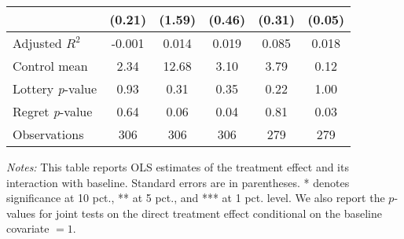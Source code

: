 \begin{table}[htbp]
{\begin{threeparttable}
\begin{tabular}{l*{5}{c}}
                &   (0.21)         &   (1.59)         &   (0.46)         &   (0.31)         &   (0.05)         \\
\midrule
Adjusted \(R^{2}\)&   -0.001         &    0.014         &    0.019         &    0.085         &    0.018         \\
Control mean    &     2.34         &    12.68         &     3.10         &     3.79         &     0.12         \\
Lottery \emph{p}-value&     0.93         &     0.31         &     0.35         &     0.22         &     1.00         \\
Regret \emph{p}-value&     0.64         &     0.06         &     0.04         &     0.81         &     0.03         \\
Observations    &      306         &      306         &      306         &      279         &      279         \\
\bottomrule \end{tabular} \begin{tablenotes}[flushleft] \footnotesize \item \emph{Notes:} This table reports OLS estimates of the treatment effect and its interaction with baseline. Standard errors are in parentheses. * denotes significance at 10 pct., ** at 5 pct., and *** at 1 pct. level. We also report the \(p\)-values for joint tests on the direct treatment effect conditional on the baseline covariate $= 1$. \end{tablenotes} \end{threeparttable} } \end{table}
